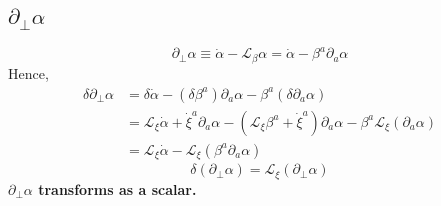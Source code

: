 \documentclass{article}
\begin{document}
\subsection{$\partial_{\perp}\alpha$}
\[
\partial_{\perp}\alpha \equiv {\dot \alpha} - \mathcal{L}_{\beta}\alpha = {\dot \alpha} - \beta^{a}\partial_{a}\alpha
\]
Hence, 
\begin{align*}
\delta \partial_{\perp} \alpha & = \delta {\dot \alpha} - (\delta\beta^{a})\partial_{a}\alpha - \beta^{a}(\delta\partial_{a}\alpha)\\
& = \mathcal{L}_{\xi}{\dot \alpha} + {\dot \xi}^{a}\partial_{a}\alpha - (\mathcal{L}_{\xi}\beta^{a} + {\dot \xi}^{a})\partial_{a}\alpha - \beta^{a}\mathcal{L}_{\xi}(\partial_{a}\alpha)\\
& = \mathcal{L}_{\xi}{\dot \alpha} - \mathcal{L}_{\xi}(\beta^{a}\partial_{a}\alpha)
\end{align*}
\[
\boxed{
\delta (\partial_{\perp}\alpha) = \mathcal{L}_{\xi}(\partial_{\perp}\alpha)
}
\]
{\bf {\color{red}$\partial_{\perp}\alpha$ transforms as a scalar.}}
\end{document}
